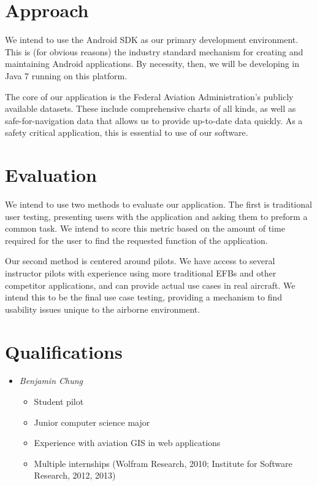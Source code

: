 \documentclass[10pt,a4paper]{report}
\begin{document}
\section{Approach}
We intend to use the Android SDK as our primary development environment. This is (for obvious reasons) the industry standard mechanism for creating and maintaining Android applications. By necessity, then, we will be developing in Java 7 running on this platform. 

The core of our application is the Federal Aviation Administration's publicly available datasets. These include comprehensive charts of all kinds, as well as safe-for-navigation data that allows us to provide up-to-date data quickly. As a safety critical application, this is essential to use of our software.

\section{Evaluation}
We intend to use two methods to evaluate our application. The first is traditional user testing, presenting users with the application and asking them to preform a common task. We intend to score this metric based on the amount of time required for the user to find the requested function of the application.

Our second method is centered around pilots. We have access to several instructor pilots with experience using more traditional EFBs and other competitor applications, and can provide actual use cases in real aircraft. We intend this to be the final use case testing, providing a mechanism to find usability issues unique to the airborne environment.

\section{Qualifications}
\begin{itemize}
\item \emph{Benjamin Chung} 
\begin{itemize}
\item Student pilot
\item Junior computer science major
\item Experience with aviation GIS in web applications
\item Multiple internships (Wolfram Research, 2010; Institute for Software Research, 2012, 2013)
\end{itemize}
\end{itemize}
\end{document}
